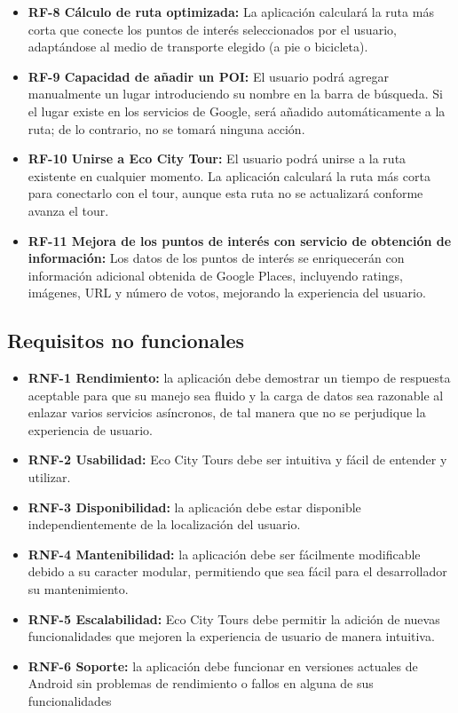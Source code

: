 \begin{itemize}
	\item \textbf{RF-8 Cálculo de ruta optimizada:} La aplicación calculará la ruta más corta que conecte los puntos de interés seleccionados por el usuario, adaptándose al medio de transporte elegido (a pie o bicicleta).
	
	\item \textbf{RF-9 Capacidad de añadir un POI:} El usuario podrá agregar manualmente un lugar introduciendo su nombre en la barra de búsqueda. Si el lugar existe en los servicios de Google, será añadido automáticamente a la ruta; de lo contrario, no se tomará ninguna acción.
	
	\item \textbf{RF-10 Unirse a Eco City Tour:} El usuario podrá unirse a la ruta existente en cualquier momento. La aplicación calculará la ruta más corta para conectarlo con el tour, aunque esta ruta no se actualizará conforme avanza el tour.
	
	\item \textbf{RF-11 Mejora de los puntos de interés con servicio de obtención de información:} Los datos de los puntos de interés se enriquecerán con información adicional obtenida de Google Places, incluyendo ratings, imágenes, URL y número de votos, mejorando la experiencia del usuario.
\end{itemize}

\subsection{Requisitos no funcionales}
\begin{itemize}
	\item \textbf{RNF-1 Rendimiento:} la aplicación debe demostrar un tiempo de respuesta aceptable para que su manejo sea fluido y la carga de datos sea razonable al enlazar varios servicios asíncronos, de tal manera que no se perjudique la experiencia de usuario. 
	\item \textbf{RNF-2 Usabilidad:} Eco City Tours debe ser intuitiva y fácil de entender y utilizar.
	\item \textbf{RNF-3 Disponibilidad:} la aplicación debe estar disponible independientemente de la localización del usuario.
	\item \textbf{RNF-4 Mantenibilidad:} la aplicación debe ser fácilmente modificable debido a su caracter modular, permitiendo que sea fácil para el desarrollador su mantenimiento.
	\item \textbf{RNF-5 Escalabilidad:} Eco City Tours debe permitir la adición de nuevas funcionalidades que mejoren la experiencia de usuario de manera intuitiva.
	\item \textbf{RNF-6 Soporte:} la aplicación debe funcionar en versiones actuales de Android sin problemas de rendimiento o fallos en alguna de sus funcionalidades
\end{itemize}
\clearpage
